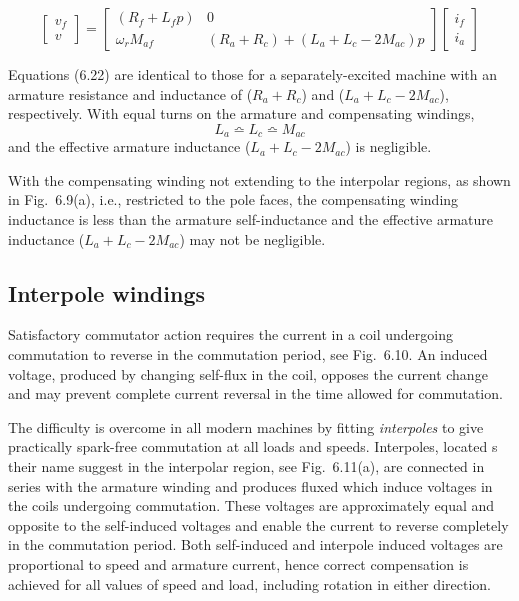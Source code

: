 \documentclass[a4paper,numbers=noenddot,12pt]{scrbook}
\begin{document}
\begin{equation}
    \begin{bmatrix}
        v_f \\[2ex] v
    \end{bmatrix} =
    \begin{bmatrix}
        (R_f + L_f p) & 0 \\[2ex]
        \omega_r M_{af} & (R_a + R_c) + (L_a + L_c -2 M_{ac})p
    \end{bmatrix}
    \begin{bmatrix}
        i_f \\[2ex] i_a
    \end{bmatrix}
    \label{}
\end{equation}

Equations (6.22) are identical to those for a separately-excited machine with an armature resistance and inductance of ($R_a + R_c$) and ($L_a + L_c - 2M_{ac}$), respectively. With equal turns on the armature and compensating windings,
\begin{equation*}
    L_a \bumpeq L_c \bumpeq M_{ac}
\end{equation*}
and the effective armature inductance ($L_a + L_c - 2M_{ac}$) is negligible.

With the compensating winding not extending to the interpolar regions, as shown in Fig.\ 6.9(a), i.e., restricted to the pole faces, the compensating winding inductance is less than the armature self-inductance and the effective armature inductance ($L_a + L_c - 2M_{ac}$) may not be negligible.

\subsection{Interpole windings}
Satisfactory commutator action requires the current in a coil undergoing commutation to reverse in the commutation period, see Fig.\ 6.10. An induced voltage, produced by changing self-flux in the coil, opposes the current change and may prevent complete current reversal in the time allowed for commutation.

The difficulty is overcome in all modern machines by fitting \textit{interpoles} to give practically spark-free commutation at all loads and speeds. Interpoles, located s their name suggest in the interpolar region, see Fig.\ 6.11(a), are connected in series with the armature winding and produces fluxed which induce voltages in the coils undergoing commutation. These voltages are approximately equal and opposite to the self-induced voltages and enable the current to reverse
completely in the commutation period. Both self-induced and interpole induced voltages are proportional to speed and armature current, hence correct compensation is achieved for all values of speed and load, including rotation in either direction.
\end{document}
